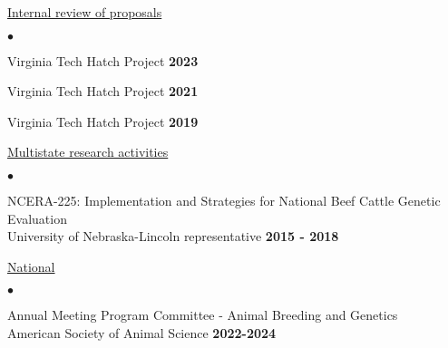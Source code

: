 \documentclass[margin,line,10pt]{res}
\newenvironment{list2}{
  \begin{list}{$\bullet$}{%
      \setlength{\itemsep}{0in}
      \setlength{\parsep}{0in} \setlength{\parskip}{0in}
      \setlength{\topsep}{0in} \setlength{\partopsep}{0in} 
      \setlength{\leftmargin}{0.2in}}}{\end{list}}
\begin{document}
\begin{resume}
\begin{flushleft}
\hspace{0.3cm} \underline{Internal review of proposals}
\end{flushleft}

\begin{list2}

\item  Virginia Tech Hatch Project \hfill \textbf{2023}  \\

  \vspace{0.3cm}

\item  Virginia Tech Hatch Project \hfill \textbf{2021}  \\

  \vspace{0.3cm}

\item  Virginia Tech Hatch Project \hfill \textbf{2019}  \\
\end{list2}



\begin{flushleft}
\hspace{0.3cm} \underline{Multistate research activities}
\end{flushleft}
\begin{list2}


\item NCERA-225: Implementation and Strategies for National Beef Cattle Genetic Evaluation \\ University of Nebraska-Lincoln representative \hfill  \textbf{2015 - 2018}\\
\end{list2}



\begin{flushleft}
  \hspace{0.3cm} \underline{National}
\end{flushleft}
\begin{list2}
\item Annual Meeting Program Committee - Animal Breeding and Genetics   \\
American Society of Animal Science   \hfill \textbf{2022-2024}\\


\end{list2}
\end{resume}
\end{document}
